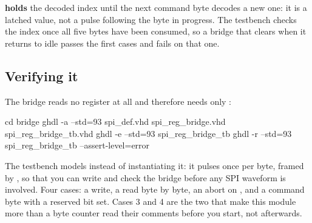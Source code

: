 \begin{warning}
 \textbf{holds} the decoded index until the next command byte decodes a new one: it is
a latched value, not a pulse following the byte in progress. The testbench checks the index once all
five bytes have been consumed, so a bridge that clears  when it returns to idle passes
the first cases and fails on that one.
\end{warning}

\subsection*{Verifying it}
The bridge reads no register at all and therefore needs only :

\begin{shell}
cd bridge
ghdl -a --std=93 spi_def.vhd spi_reg_bridge.vhd spi_reg_bridge_tb.vhd
ghdl -e --std=93 spi_reg_bridge_tb
ghdl -r --std=93 spi_reg_bridge_tb --assert-level=error
\end{shell}

The testbench models  instead of instantiating it: it pulses  once per
byte, framed by , so that you can write and check the bridge before any SPI waveform
is involved. Four cases: a write, a read byte by byte, an abort on , and a command
byte with a reserved bit set. Cases 3 and 4 are the two that make this module more than a byte
counter \textemdash{} read their comments before you start, not afterwards.
